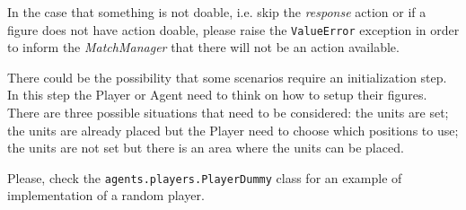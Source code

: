 \documentclass[a4paper]{report}
\begin{document}
	In the case that something is not doable, i.e. skip the \textit{response} action or if a figure does not have action doable, please raise the \texttt{ValueError} exception in order to inform the \textit{MatchManager} that there will not be an action available.

	There could be the possibility that some scenarios require an initialization step. In this step the Player or Agent need to think on how to setup their figures. There are three possible situations that need to be considered: the units are set; the units are already placed but the Player need to choose which positions to use; the units are not set but there is an area where the units can be placed.

	Please, check the \texttt{agents.players.PlayerDummy} class for an example of implementation of a random player.


	{}
	
\end{document}
